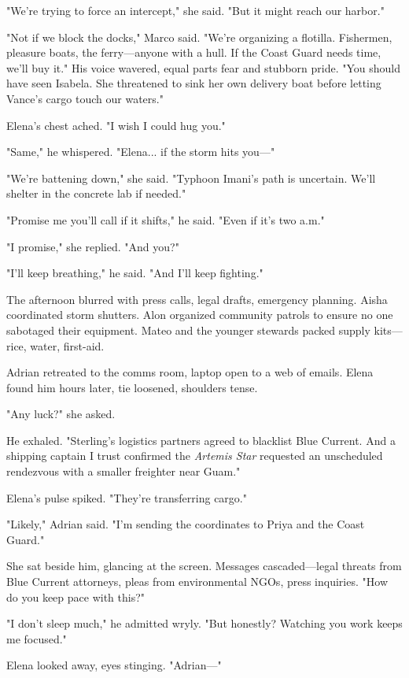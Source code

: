 "We're trying to force an intercept," she said. "But it might reach our harbor."

"Not if we block the docks," Marco said. "We're organizing a flotilla. Fishermen, pleasure boats, the ferry—anyone with a hull. If the Coast Guard needs time, we'll buy it." His voice wavered, equal parts fear and stubborn pride. "You should have seen Isabela. She threatened to sink her own delivery boat before letting Vance's cargo touch our waters."

Elena's chest ached. "I wish I could hug you."

"Same," he whispered. "Elena... if the storm hits you—"

"We're battening down," she said. "Typhoon Imani's path is uncertain. We'll shelter in the concrete lab if needed."

"Promise me you'll call if it shifts," he said. "Even if it's two a.m."

"I promise," she replied. "And you?"

"I'll keep breathing," he said. "And I'll keep fighting."

\bigskip

The afternoon blurred with press calls, legal drafts, emergency planning. Aisha coordinated storm shutters. Alon organized community patrols to ensure no one sabotaged their equipment. Mateo and the younger stewards packed supply kits—rice, water, first-aid.

Adrian retreated to the comms room, laptop open to a web of emails. Elena found him hours later, tie loosened, shoulders tense.

"Any luck?" she asked.

He exhaled. "Sterling's logistics partners agreed to blacklist Blue Current. And a shipping captain I trust confirmed the \textit{Artemis Star} requested an unscheduled rendezvous with a smaller freighter near Guam."

Elena's pulse spiked. "They're transferring cargo."

"Likely," Adrian said. "I'm sending the coordinates to Priya and the Coast Guard."

She sat beside him, glancing at the screen. Messages cascaded—legal threats from Blue Current attorneys, pleas from environmental NGOs, press inquiries. "How do you keep pace with this?"

"I don't sleep much," he admitted wryly. "But honestly? Watching you work keeps me focused."

Elena looked away, eyes stinging. "Adrian—"

